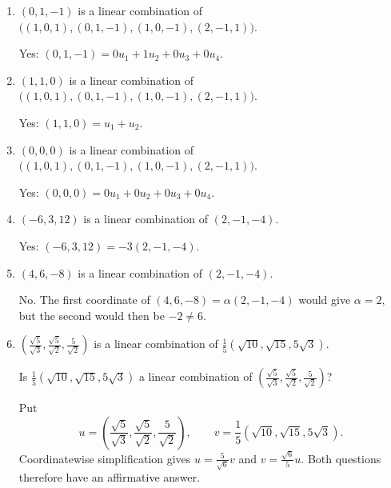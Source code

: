 \begin{enumerate}[label=\alph*)]
\item $(0,1,-1)$ is a linear combination of $\bigl((1,0,1),(0,1,-1),(1,0,-1),(2,-1,1)\bigr)$.

\begin{answer}
Yes: $(0,1,-1)=0u_1+1u_2+0u_3+0u_4$.
\end{answer}

\item $(1,1,0)$ is a linear combination of $\bigl((1,0,1),(0,1,-1),(1,0,-1),(2,-1,1)\bigr)$.

\begin{answer}
Yes: $(1,1,0)=u_1+u_2$.
\end{answer}

\item $(0,0,0)$ is a linear combination of $\bigl((1,0,1),(0,1,-1),(1,0,-1),(2,-1,1)\bigr)$.

\begin{answer}
Yes: $(0,0,0)=0u_1+0u_2+0u_3+0u_4$.
\end{answer}

\item $(-6,3,12)$ is a linear combination of $(2,-1,-4)$.

\begin{answer}
Yes: $(-6,3,12)=-3(2,-1,-4)$.
\end{answer}

\item $(4,6,-8)$ is a linear combination of $(2,-1,-4)$.

\begin{answer}
No. The first coordinate of $(4,6,-8)=\alpha(2,-1,-4)$ would give
$\alpha=2$, but the second would then be $-2\ne6$.
\end{answer}

\item $\left(\frac{\sqrt5}{\sqrt3},\frac{\sqrt5}{\sqrt2},\frac5{\sqrt2}\right)$ is a linear combination of $\frac15(\sqrt{10},\sqrt{15},5\sqrt3)$.

Is $\frac15(\sqrt{10},\sqrt{15},5\sqrt3)$ a linear combination of $\left(\frac{\sqrt5}{\sqrt3},\frac{\sqrt5}{\sqrt2},\frac5{\sqrt2}\right)$?

\begin{answer}
Put
\[
 u=\left(\frac{\sqrt5}{\sqrt3},\frac{\sqrt5}{\sqrt2},\frac5{\sqrt2}\right),
 \qquad v=\frac15(\sqrt{10},\sqrt{15},5\sqrt3).
\]
Coordinatewise simplification gives
$u=\frac5{\sqrt6}v$ and $v=\frac{\sqrt6}{5}u$.
Both questions therefore have an affirmative answer.
\end{answer}
\end{enumerate}
